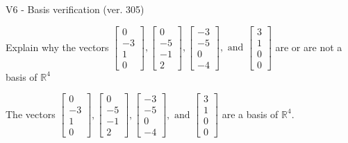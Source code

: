 \begin{exercise}
  \begin{exerciseTitle}V6 - Basis verification (ver. 305)\end{exerciseTitle}
  \begin{exerciseStatement}
    Explain why the vectors \(\left[\begin{array}{r}
0 \\
-3 \\
1 \\
0
\end{array}\right] , \left[\begin{array}{r}
0 \\
-5 \\
-1 \\
2
\end{array}\right] , \left[\begin{array}{r}
-3 \\
-5 \\
0 \\
-4
\end{array}\right] , \text{ and } \left[\begin{array}{r}
3 \\
1 \\
0 \\
0
\end{array}\right]\) are or are not a basis of \(\mathbb{R}^4\)	


  \end{exerciseStatement}
  \begin{exerciseAnswer}
   The vectors \(\left[\begin{array}{r}
0 \\
-3 \\
1 \\
0
\end{array}\right] , \left[\begin{array}{r}
0 \\
-5 \\
-1 \\
2
\end{array}\right] , \left[\begin{array}{r}
-3 \\
-5 \\
0 \\
-4
\end{array}\right] , \text{ and } \left[\begin{array}{r}
3 \\
1 \\
0 \\
0
\end{array}\right]\) 
  	 are  a basis of \(\mathbb{R}^4\).
  


  \end{exerciseAnswer}
\end{exercise}
